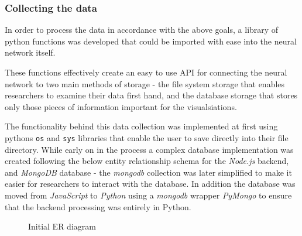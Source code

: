 \documentclass[a4paper,11pt,titlepage]{article}
\begin{document}
	\subsubsection{Collecting the data}
	\par 
	In order to process the data in accordance with the above goals, a library of python functions was developed that could be imported with ease into the neural network itself.
	\par 
	These functions effectively create an easy to use API for connecting the neural network to two main methods of storage - the file system storage that enables researchers to examine their data first hand, and the database storage that stores only those pieces of information important for the visualsiations. 
	\par 
	The functionality behind this data collection was implemented at first using pythons \texttt{os} and \texttt{sys} libraries that enable the user to save directly into their file directory. While early on in the process a complex database implementation was created following the below entity relationship schema for the \textit{Node.js} backend, and \textit{MongoDB} database - the \textit{mongodb} collection was later simplified to make it easier for researchers to interact with the database. In addition the database was moved from \textit{JavaScript} to \textit{Python} using a \textit{mongodb} wrapper \textit{PyMongo} to ensure that the backend processing was entirely in Python.
	
	\begin{figure}[H]
    			\caption{Initial ER diagram}%
	\end{figure}	
	
\end{document}

